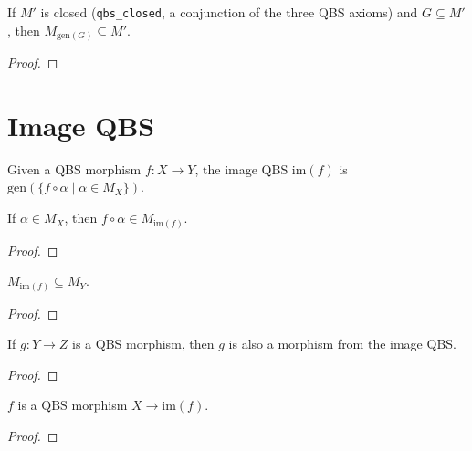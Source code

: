 \begin{lemma}\label{lem:generating_qbs_least}
  \rocqok
  If $M'$ is closed (\texttt{qbs\_closed}, a conjunction of the three QBS axioms) and $G \subseteq M'$, then
  $M_{\mathrm{gen}(G)} \subseteq M'$.
\end{lemma}
\begin{proof}\rocqok\end{proof}


\section{Image QBS}\label{sec:image}

\begin{definition}\label{def:map_qbs}
  \rocqok
  Given a QBS morphism $f : X \to Y$, the image QBS
  $\mathrm{im}(f)$ is $\mathrm{gen}(\{f \circ \alpha \mid \alpha \in M_X\})$.
\end{definition}

\begin{lemma}\label{lem:map_qbs_random}
  \rocqok
  If $\alpha \in M_X$, then $f \circ \alpha \in M_{\mathrm{im}(f)}$.
\end{lemma}
\begin{proof}\rocqok\end{proof}

\begin{lemma}\label{lem:map_qbs_sub}
  \rocqok
  $M_{\mathrm{im}(f)} \subseteq M_Y$.
\end{lemma}
\begin{proof}\rocqok\end{proof}

\begin{lemma}\label{lem:map_qbs_morphism_out}
  \rocqok
  If $g : Y \to Z$ is a QBS morphism, then
  $g$ is also a morphism from the image QBS.
\end{lemma}
\begin{proof}\rocqok\end{proof}

\begin{lemma}\label{lem:map_qbs_morphism_in}
  \rocqok
  $f$ is a QBS morphism $X \to \mathrm{im}(f)$.
\end{lemma}
\begin{proof}\rocqok\end{proof}


